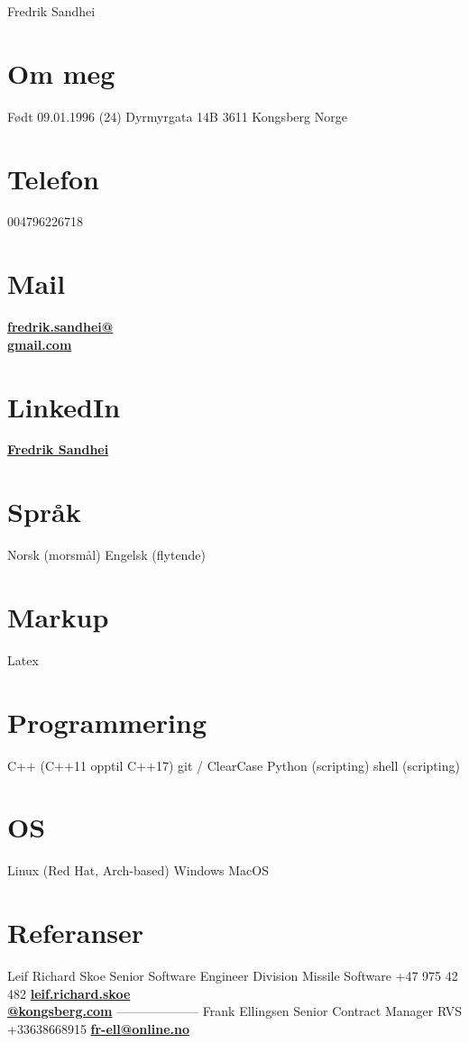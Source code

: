 \documentclass[]{friggeri-cv}
\begin{document}
       {Fredrik Sandhei}

\begin{aside}
  \section{Om meg}
    Født 09.01.1996 (24)
    Dyrmyrgata 14B 
    3611 Kongsberg
    Norge
  \section{Telefon}
    004796226718
  \section{Mail}
    \href{mailto:fredrik.sandhei@gmail.com}{\textbf{fredrik.sandhei@\\gmail.com}}   
  \section{LinkedIn}
  	\href{https://www.linkedin.com/in/fredrik-sandhei-7738b617a/}{\textbf{Fredrik Sandhei}}
  \section{Språk}
    Norsk (morsmål)
    Engelsk (flytende)
  \section{Markup}
  	Latex
  \section{Programmering}
    C++ (C++11 opptil C++17)
    git / ClearCase 
    Python (scripting)
    shell (scripting)
  \section{OS}
  	Linux (Red Hat, Arch-based)
  	Windows
  	MacOS
  \section{Referanser}
    Leif Richard Skoe
    Senior Software Engineer
    Division Missile Software
    +47 975 42 482
   \href{mailto:leif.richard.skoe@kongsberg.com}{\textbf{leif.richard.skoe\\@kongsberg.com}}	
    --------------------
    Frank Ellingsen
    Senior Contract Manager
    RVS
    +33\hspace{0.1cm}638668915
    \href{mailto:fr-ell@online.no}{\textbf{fr-ell@online.no}}
\end{aside}
\end{document}
